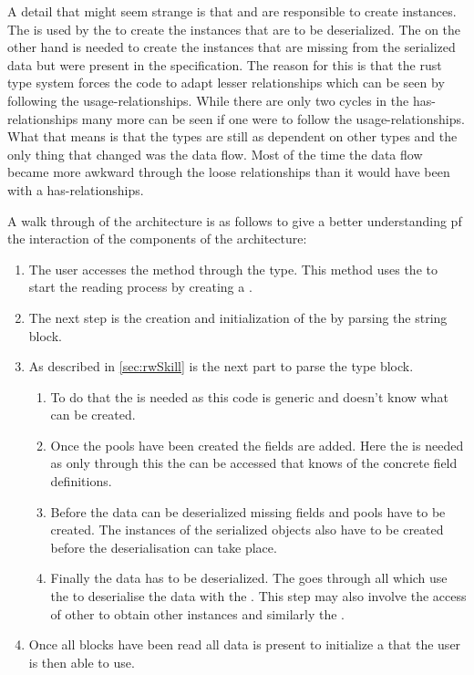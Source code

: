 \documentclass[thesis]{subfiles}
\begin{document}
  A detail that might seem strange is that \PoolProxy and \PoolMaker are responsible to create \UserFieldDeclarations instances.
  The \PartsMaker is used by the \Pool to create the \UserFieldDeclaration instances that are to be deserialized.
  The \PoolProxy on the other hand is needed to create the \UserFieldDeclaration instances that are missing from the serialized data but were present in the specification.
  The reason for this is that the rust type system forces the code to adapt lesser relationships which can be seen by following the usage-relationships.
  While there are only two cycles in the has-relationships many more can be seen if one were to follow the usage-relationships.
  What that means is that the types are still as dependent on other types and the only thing that changed was the data flow.
  Most of the time the data flow became more awkward through the loose relationships than it would have been with a has-relationships.

  A walk through of the architecture is as follows to give a better understanding pf the interaction of the components of the architecture:
  \begin{enumerate}
    \item
          The user accesses the \static \open method through the \SkillFile type.
          This method uses the \SkillFileBuilder to start the reading process by creating a \FileReader.
    \item
          The next step is the creation and initialization of the \StringPool by parsing the string block.
    \item
          As described in \autoref{sec:rwSkill} is the next part to parse the type block.
          \begin{enumerate}
            \item
                  To do that the \PoolMaker is needed as this code is generic and doesn't know what \UserTypePools can be created.
            \item
                  Once the pools have been created the fields are added.
                  Here the \PoolProxy \trait is needed as only through this \trait the \PartsMaker can be accessed that knows of the concrete field definitions.
            \item
                  Before the data can be deserialized missing fields and pools have to be created.
                  The instances of the serialized objects also have to be created before the deserialisation can take place.
            \item
                  Finally the data has to be deserialized.
                  The \SkillFileBuilder goes through all \UserTypePools which use the \FieldDeclarations to deserialise the data with the \FileReader.
                  This step may also involve the access of other \UserTypePools to obtain other \UserType instances and similarly the \StringPool.
          \end{enumerate}
    \item Once all blocks have been read all data is present to initialize a \SkillFile that the user is then able to use.
  \end{enumerate}
\end{document}
